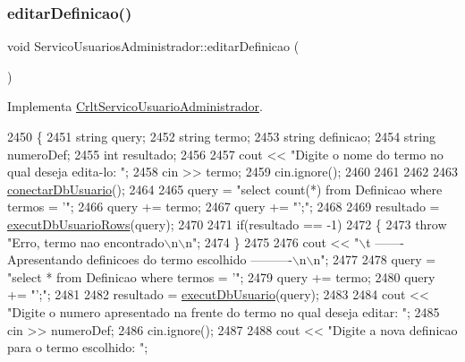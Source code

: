 \subsubsection{\texorpdfstring{editar\+Definicao()}{editarDefinicao()}}
{\footnotesize\ttfamily void Servico\+Usuarios\+Administrador\+::editar\+Definicao (\begin{DoxyParamCaption}{ }\end{DoxyParamCaption})\hspace{0.3cm}{\ttfamily [virtual]}}



Implementa \mbox{\hyperlink{class_crlt_servico_usuario_administrador_a7b709ffa7b27a96970c71997d75b1032}{Crlt\+Servico\+Usuario\+Administrador}}.


\begin{DoxyCode}
2450     \{
2451       \textcolor{keywordtype}{string} query;
2452       \textcolor{keywordtype}{string} termo;
2453       \textcolor{keywordtype}{string} definicao;
2454       \textcolor{keywordtype}{string} numeroDef;
2455       \textcolor{keywordtype}{int} resultado;
2456 
2457       cout << \textcolor{stringliteral}{"Digite o nome do termo no qual deseja edita-lo: "};
2458       cin >> termo;
2459       cin.ignore();
2460 
2461 
2462 
2463       \mbox{\hyperlink{comando_sql_8cpp_a4f89ddcbc4cf8f2587d89f72f8c7900d}{conectarDbUsuario}}();
2464 
2465       query = \textcolor{stringliteral}{"select count(*) from Definicao where termos = '"};
2466       query += termo;
2467       query += \textcolor{stringliteral}{"';"};
2468 
2469       resultado = \mbox{\hyperlink{comando_sql_8cpp_af54952694f2fa7d76f969fb74b853cb9}{executDbUsuarioRows}}(query);
2470 
2471       \textcolor{keywordflow}{if}(resultado == -1)
2472       \{
2473         \textcolor{keywordflow}{throw} \textcolor{stringliteral}{"Erro, termo nao encontrado\(\backslash\)n\(\backslash\)n"};
2474       \}
2475 
2476       cout << \textcolor{stringliteral}{"\(\backslash\)t ------- Apresentando definicoes do termo escolhido ----------\(\backslash\)n\(\backslash\)n"};
2477 
2478       query = \textcolor{stringliteral}{"select * from Definicao where termos = '"};
2479       query += termo;
2480       query += \textcolor{stringliteral}{"';"};
2481 
2482       resultado = \mbox{\hyperlink{comando_sql_8cpp_a748197580e7f9acdbf48c78de1f7924b}{executDbUsuario}}(query);
2483 
2484       cout << \textcolor{stringliteral}{"Digite o numero apresentado na frente do termo no qual deseja editar: "};
2485       cin >> numeroDef;
2486       cin.ignore();
2487 
2488      cout << \textcolor{stringliteral}{"Digite a nova definicao para o termo escolhido: "};

\end{DoxyCode}
